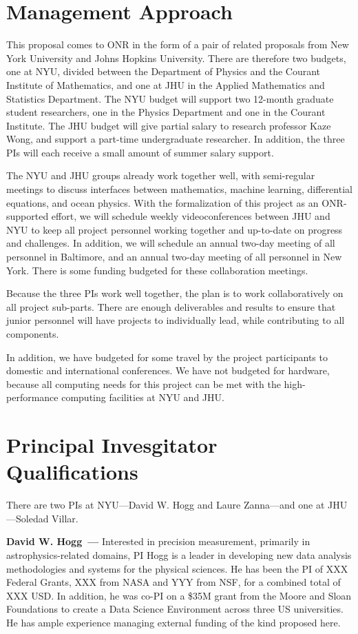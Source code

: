 \documentclass[11pt]{article}
\renewcommand{\paragraph}[1]{\medskip\par\noindent\textbf{#1~---}}
\begin{document}
\section{Management Approach}
This proposal comes to ONR in the form of a pair of related proposals from New York University and Johns Hopkins University.
There are therefore two budgets, one at NYU, divided between the Department of Physics and the Courant Institute of Mathematics, and one at JHU in the Applied Mathematics and Statistics Department.
The NYU budget will support two 12-month graduate student researchers, one in the Physics Department and one in the Courant Institute.
The JHU budget will give partial salary to research professor Kaze Wong, and support a part-time undergraduate researcher.
In addition, the three PIs will each receive a small amount of summer salary support.

The NYU and JHU groups already work together well, with semi-regular meetings to discuss interfaces between mathematics, machine learning, differential equations, and ocean physics.
With the formalization of this project as an ONR-supported effort, we will schedule weekly videoconferences between JHU and NYU to keep all project personnel working together and up-to-date on progress and challenges.
In addition, we will schedule an annual two-day meeting of all personnel in Baltimore, and an annual two-day meeting of all personnel in New York.
There is some funding budgeted for these collaboration meetings.

Because the three PIs work well together, the plan is to work collaboratively on all project sub-parts.
There are enough deliverables and results to ensure that junior personnel will have projects to individually lead, while contributing to all components.

In addition, we have budgeted for some travel by the project participants to domestic and international conferences.
We have not budgeted for hardware, because all computing needs for this project can be met with the high-performance computing facilities at NYU and JHU.

\section{Principal Invesgitator Qualifications}

There are two PIs at NYU---David W. Hogg and Laure Zanna---and one at JHU---Soledad Villar.

\paragraph{David W. Hogg}
Interested in precision measurement, primarily in astrophysics-related domains, PI Hogg is a leader in developing new data analysis methodologies and systems for the physical sciences.
He has been the PI of XXX Federal Grants, XXX from NASA and YYY from NSF, for a combined total of XXX USD.
In addition, he was co-PI on a \$35M grant from the Moore and Sloan Foundations to create a Data Science Environment across three US universities.
He has ample experience managing external funding of the kind proposed here.
\end{document}
